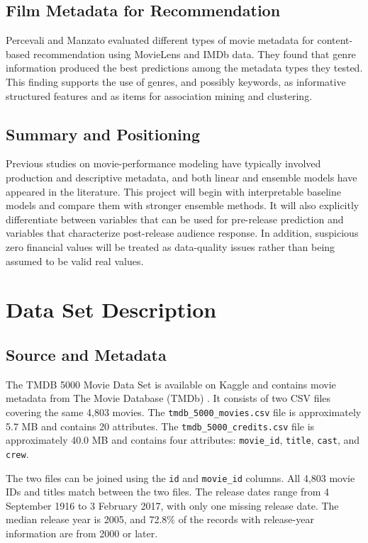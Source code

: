 \documentclass[conference]{IEEEtran}
\begin{document}
\subsection{Film Metadata for Recommendation}

Percevali and Manzato \cite{percevali2013} evaluated different types of movie metadata for content-based recommendation using MovieLens and IMDb data. They found that genre information produced the best predictions among the metadata types they tested. This finding supports the use of genres, and possibly keywords, as informative structured features and as items for association mining and clustering.



\subsection{Summary and Positioning}

Previous studies on movie-performance modeling have typically involved production and descriptive metadata, and both linear and ensemble models have appeared in the literature. This project will begin with interpretable baseline models and compare them with stronger ensemble methods. It will also explicitly differentiate between variables that can be used for pre-release prediction and variables that characterize post-release audience response. In addition, suspicious zero financial values will be treated as data-quality issues rather than being assumed to be valid real values.


\section{Data Set Description}\label{sec:data}
\subsection{Source and Metadata}
The TMDB 5000 Movie Data Set is available on Kaggle and contains
movie metadata from The Movie Database (TMDb) \cite{tmdb,kaggle}.
It consists of two CSV files covering the same 4,803 movies.
The \texttt{tmdb\_5000\_movies.csv} file is approximately 5.7 MB
and contains 20 attributes. The \texttt{tmdb\_5000\_credits.csv}
file is approximately 40.0 MB and contains four attributes:
\texttt{movie\_id}, \texttt{title}, \texttt{cast}, and \texttt{crew}.

The two files can be joined using the \texttt{id} and
\texttt{movie\_id} columns. All 4,803 movie IDs and titles match
between the two files. The release dates range from 4 September
1916 to 3 February 2017, with only one missing release date.
The median release year is 2005, and 72.8\% of the records with
release-year information are from 2000 or later.
\end{document}
